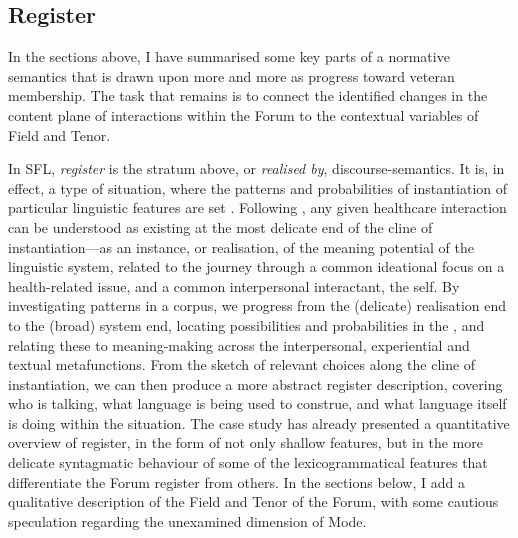 \subsection{Register} \label{sect:discuss-register}

In the sections above, I have summarised some key parts of a normative semantics that is drawn upon more and more as  progress toward veteran membership. The task that remains is to connect the identified changes in the content plane of interactions within the \gls{Forum} to the contextual variables of Field and Tenor.

In \gls{SFL}, \emph{register} is the stratum above, or \emph{realised by}, \glspl{discourse-semantic}. It is, in effect, a type of situation, where the patterns and probabilities of instantiation of particular linguistic features are set \cite{halliday_introduction_2004,lukin2011halliday}.
Following \textcite{matthiessen_applying_2013}, any given healthcare interaction can be understood as existing at the most delicate end of the cline of instantiation---as an instance, or realisation, of the meaning potential of the linguistic system, related to the journey through a common ideational focus on a health\hyp{}related issue, and a common interpersonal interactant, the self. By investigating patterns in a \gls{corpus}, we progress from the (delicate) realisation end to the (broad) system end, locating possibilities and probabilities in the , and relating these to meaning\hyp{}making across the interpersonal, experiential and textual metafunctions. From the sketch of relevant choices along the cline of instantiation, we can then produce a more abstract register description, covering who is talking, what language is being used to construe, and what language itself is doing within the situation. The case study has already presented a quantitative overview of register, in the form of not only shallow features, but in the more delicate syntagmatic behaviour of some of the lexicogrammatical features that differentiate the \gls{Forum} register from others. In the sections below, I add a qualitative description of the Field and Tenor of the \gls{Forum}, with some cautious speculation regarding the unexamined dimension of Mode.


